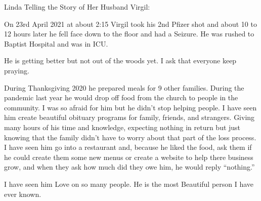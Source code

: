 Linda Telling the Story of Her Husband Virgil:

On 23rd April 2021 at about 2:15 Virgil took his 2nd Pfizer shot and about 10 to
12 hours later he fell face down to the floor and had a Seizure. He was rushed
to Baptist Hospital and was in ICU.

He is getting better but not out of the woods yet. I ask that everyone keep praying.

During Thanksgiving 2020 he prepared meals for 9 other families. During the
pandemic last year he would drop off food from the church to people in the
community. I was so afraid for him but he didn’t stop helping people. I have
seen him create beautiful obituary programs for family, friends, and
strangers. Giving many hours of his time and knowledge, expecting nothing in
return but just knowing that the family didn’t have to worry about that part of
the loss process. I have seen him go into a restaurant and, because he liked the
food, ask them if he could create them some new menus or create a website to
help there business grow, and when they ask how much did they owe him, he would
reply “nothing.”

I have seen him Love on so many people. He is the most Beautiful person I have
ever known.

